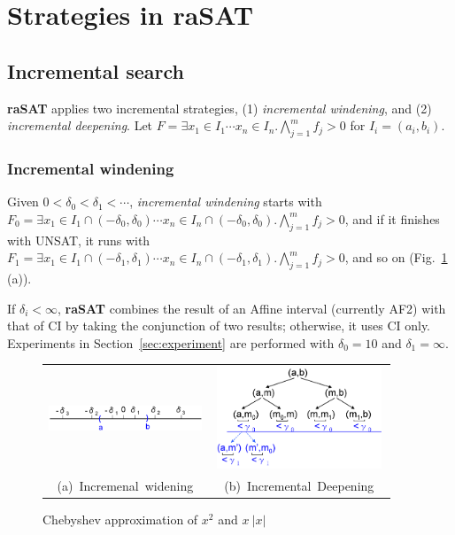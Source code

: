 \documentclass[runningheads,a4paper,oribibl]{llncs}
\begin{document}
\section{Strategies in raSAT} \label{sec:strategy}

\subsection{Incremental search} \label{sec:incsearch}

{\bf raSAT} applies two incremental strategies, 
(1) {\em incremental windening}, and (2) {\em incremental deepening}. 
Let
$F = \exists x_1 \in I_1 \cdots x_n \in I_n. \bigwedge \limits_{j=1}^m f_j > 0$
for $I_i = (a_i,b_i)$. %

\subsubsection*{Incremental windening}
Given $0 < \delta_0 < \delta_1 < \cdots$, 
{\em incremental windening} starts with 
$F_0 = \exists x_1 \in I_1 \cap (-\delta_0 , \delta_0) \cdots x_n \in I_n \cap (-\delta_0 , \delta_0). 
\bigwedge \limits_{j=1}^m f_j > 0$, 
and if it finishes with UNSAT, it runs with 
$F_1 = \exists x_1 \in I_1 \cap (-\delta_1 , \delta_1) \cdots x_n \in I_n \cap (-\delta_1 , \delta_1). 
\bigwedge \limits_{j=1}^m f_j > 0$, and so on (Fig.~\ref{fig:incwid} (a)). 

If $\delta_i < \infty$, {\bf raSAT} combines the result of an Affine interval (currently AF2) with that of CI by taking the conjunction of two results; otherwise, 
it uses CI only. 
Experiments in Section~\ref{sec:experiment} are performed 
with $\delta_0 = 10$ and $\delta_1 = \infty$.
\begin{figure}[ht]
\begin{minipage}[b]{1.0\linewidth}
\centering
\begin{tabular}{c@{\qquad}c}
\includegraphics[height=0.4in,width=1.8in]{IncWiden.png} &
\includegraphics[height=1.2in,width=2in]{IncDeepen.png} \\
\mbox{(a) Incremenal widening} & \mbox{(b) Incremental Deepening} \\
\end{tabular}
\caption{Chebyshev approximation of $x^2$ and $x~|x|$}
\label{fig:incwid}
\end{minipage}
\end{figure}
\end{document}
